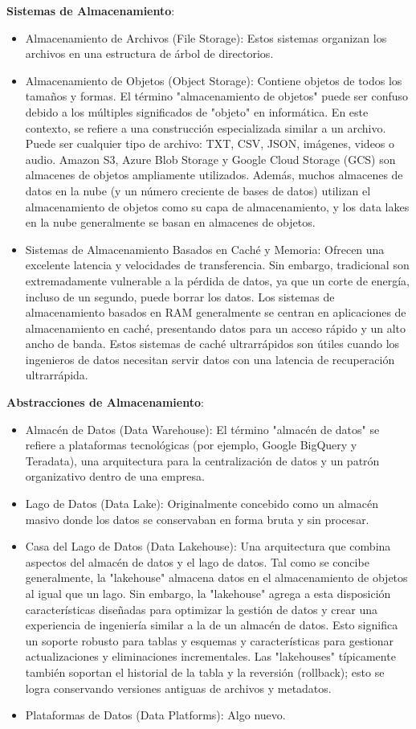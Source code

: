 \documentclass[12pt]{book}
\begin{document}
\textbf{Sistemas de Almacenamiento}:
\begin{itemize}
    \item Almacenamiento de Archivos (File Storage): Estos sistemas organizan los archivos en una estructura de árbol de directorios.
    \item Almacenamiento de Objetos (Object Storage): Contiene objetos de todos los tamaños y formas. El término "almacenamiento de objetos" puede ser confuso debido a los múltiples significados de "objeto" en informática. En este contexto, se refiere a una construcción especializada similar a un archivo.  Puede ser cualquier tipo de archivo: TXT, CSV, JSON, imágenes, videos o audio.  Amazon S3, Azure Blob Storage y Google Cloud Storage (GCS) son almacenes de objetos ampliamente utilizados. Además, muchos almacenes de datos en la nube (y un número creciente de bases de datos) utilizan el almacenamiento de objetos como su capa de almacenamiento, y los data lakes en la nube generalmente se basan en almacenes de objetos.
    \item Sistemas de Almacenamiento Basados en Caché y Memoria: Ofrecen una excelente latencia y velocidades de transferencia. Sin embargo, tradicional son extremadamente vulnerable a la pérdida de datos, ya que un corte de energía, incluso de un segundo, puede borrar los datos. Los sistemas de almacenamiento basados en RAM generalmente se centran en aplicaciones de almacenamiento en caché, presentando datos para un acceso rápido y un alto ancho de banda. Estos sistemas de caché ultrarrápidos son útiles cuando los ingenieros de datos necesitan servir datos con una latencia de recuperación ultrarrápida.
\end{itemize}

\textbf{Abstracciones de Almacenamiento}:
\begin{itemize}
    \item Almacén de Datos (Data Warehouse): El término "almacén de datos" se refiere a plataformas tecnológicas (por ejemplo, Google BigQuery y Teradata), una arquitectura para la centralización de datos y un patrón organizativo dentro de una empresa.
    \item Lago de Datos (Data Lake): Originalmente concebido como un almacén masivo donde los datos se conservaban en forma bruta y sin procesar.
    \item Casa del Lago de Datos (Data Lakehouse): Una arquitectura que combina aspectos del almacén de datos y el lago de datos.  Tal como se concibe generalmente, la "lakehouse" almacena datos en el almacenamiento de objetos al igual que un lago. Sin embargo, la "lakehouse" agrega a esta disposición características diseñadas para optimizar la gestión de datos y crear una experiencia de ingeniería similar a la de un almacén de datos. Esto significa un soporte robusto para tablas y esquemas y características para gestionar actualizaciones y eliminaciones incrementales.  Las "lakehouses" típicamente también soportan el historial de la tabla y la reversión (rollback); esto se logra conservando versiones antiguas de archivos y metadatos.
    \item Plataformas de Datos (Data Platforms): Algo nuevo.
\end{itemize}
\end{document}
